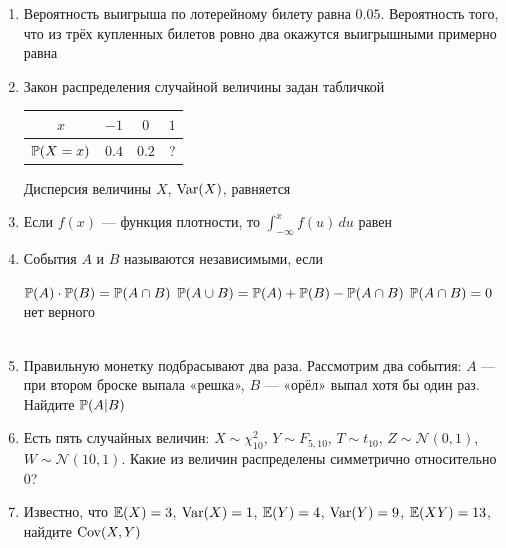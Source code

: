 \documentclass[12pt, a4paper]{article}\usepackage[]{graphicx}\usepackage[]{color}
\newcommand{\cN}{\mathcal{N}}
\begin{document}
\begin{enumerate}


\item Вероятность выигрыша по лотерейному билету равна $0.05$. Вероятность того, что из трёх купленных билетов ровно два окажутся выигрышными примерно равна


\item Закон распределения случайной величины задан табличкой

\begin{tabular}{@{}cccc@{}}
\toprule
$x$         & $-1$  & $0$   & $1$ \\ \midrule
$\P(X=x)$ & $0.4$ & $0.2$ & ?   \\ \bottomrule
\end{tabular}

Дисперсия величины $X$, $\Var(X)$, равняется


\item Если $f(x)$ — функция плотности, то $\int_{-\infty}^{x}f(u)\,du$ равен


\item События $A$ и $B$ называются независимыми, если

{$\P(A)\cdot\P(B)=\P(A\cap B)$}
{$\P(A\cup B)=\P(A)+\P(B)-\P(A\cap B)$}
{$\P(A\cap B)=0$}
{нет верного} \\ \\

\item Правильную монетку подбрасывают два раза. Рассмотрим два события: $A$ — при втором броске выпала «решка», $B$ — «орёл» выпал хотя бы один раз. Найдите $\P(A|B)$


\item Есть пять случайных величин: $X\sim \chi^2_{10}$, $Y\sim F_{5,10}$, $T\sim t_{10}$, $Z\sim \cN(0,1)$, $W\sim \cN(10,1)$. Какие из величин распределены симметрично относительно 0?


\item Известно, что $\E(X)=3$, $\Var(X)=1$, $\E(Y)=4$, $\Var(Y)=9$, $\E(XY)=13$, найдите $\Cov(X,Y)$



\end{enumerate}
\end{document}
